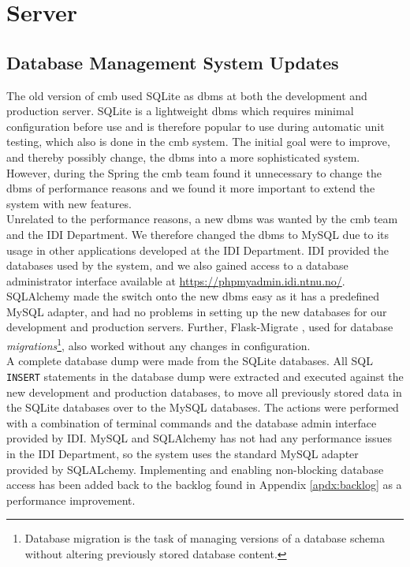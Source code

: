 \section{Server}
\label{sec:impr-server}
\subsection{Database Management System Updates}
The old version of \gls{cmb} used SQLite \cite{SQLITE} as \gls{dbms} at both the development and production server. SQLite is a lightweight \gls{dbms} which requires minimal configuration before use and is therefore popular to use during automatic unit testing, which also is done in the \gls{cmb} system. The initial goal were to improve, and thereby possibly change, the \gls{dbms} into a more sophisticated system. However, during the Spring the \gls{cmb} team found it unnecessary to change the \gls{dbms} of performance reasons and we found it more important to extend the system with new features. \\

Unrelated to the performance reasons, a new \gls{dbms} was wanted by the \gls{cmb} team and the IDI Department. We therefore changed the \gls{dbms} to MySQL due to its usage in other applications developed at the IDI Department. IDI provided the databases used by the system, and we also gained access to a database administrator interface available at \url{https://phpmyadmin.idi.ntnu.no/}. SQLAlchemy made the switch onto the new \gls{dbms} easy as it has a predefined MySQL adapter, and had no problems in setting up the new databases for our development and production servers. Further, Flask-Migrate \cite{FLASKMIGRATE}, used for database \textit{migrations}\footnote{Database migration is the task of managing versions of a database schema without altering previously stored database content.}, also worked without any changes in configuration. \\

A complete database dump were made from the SQLite databases. All SQL \texttt{INSERT} statements in the database dump were extracted and executed against the new development and production databases, to move all previously stored data in the SQLite databases over to the MySQL databases. The actions were performed with a combination of terminal commands and the database admin interface provided by IDI. MySQL and SQLAlchemy has not had any performance issues in the IDI Department, so the system uses the standard MySQL adapter provided by SQLALchemy. Implementing and enabling non-blocking database access has been added back to the backlog found in Appendix \ref{apdx:backlog} as a performance improvement.

